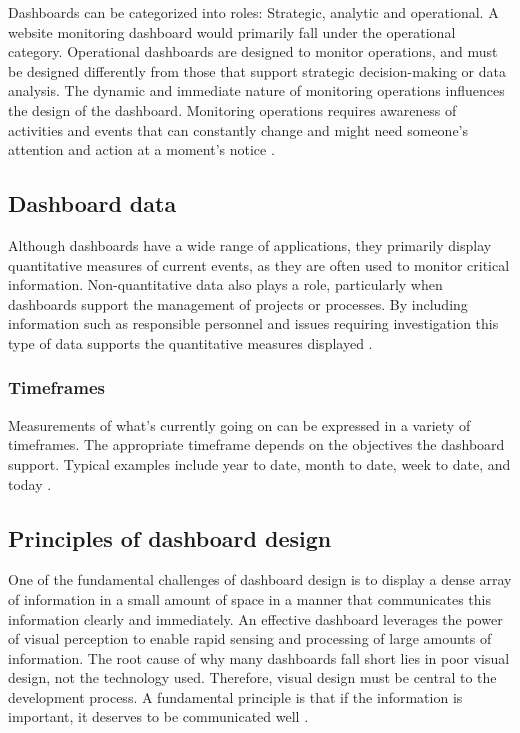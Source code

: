 Dashboards can be categorized into roles: Strategic, analytic and operational. A website monitoring dashboard would primarily fall under the operational category. Operational dashboards are designed to monitor operations, and must be designed differently from those that support strategic decision-making or data analysis. The dynamic and immediate nature of monitoring operations influences the design of the dashboard. Monitoring operations requires awareness of activities and events that can constantly change and might need someone's attention and action at a moment's notice \autocite[p. 31-32]{FewDashboard}.

\subsection{Dashboard data}
\label{subsec:dashboard_data}

Although dashboards have a wide range of applications, they primarily display quantitative measures of current events, as they are often used to monitor critical information. Non-quantitative data also plays a role, particularly when dashboards support the management of projects or processes. By including information such as responsible personnel and issues requiring investigation this type of data supports the quantitative measures displayed \autocite[p. 33-36]{FewDashboard}.


\subsubsection{Timeframes}
\label{subsubsec:timeframes}


Measurements of what’s currently going on can be expressed in a variety of timeframes. The appropriate timeframe depends on the objectives the dashboard support. Typical examples include year to date, month to date, week to date, and today \autocite[p. 33]{FewDashboard}. 

\subsection{Principles of dashboard design}
\label{subsec:principles_of_dashboard_design}


One of the fundamental challenges of dashboard design is to display a dense array of information in a small amount of space in a manner that communicates this information clearly and immediately. An effective dashboard leverages the power of visual perception to enable rapid sensing and processing of large amounts of information. The root cause of why many dashboards fall short lies in poor visual design, not the technology used. Therefore, visual design must be central to the development process. A fundamental principle is that if the information is important, it deserves to be communicated well \autocite[p. 6]{FewDashboard}.


